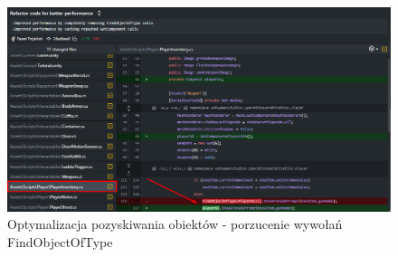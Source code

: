 \begin{figure}[h]
    \centering
    \includegraphics[width=1\linewidth]{Images/findObjectsOptimization.png}
    \caption{Optymalizacja pozyskiwania obiektów - porzucenie wywołań FindObjectOfType}
\end{figure}
\FloatBarrier

